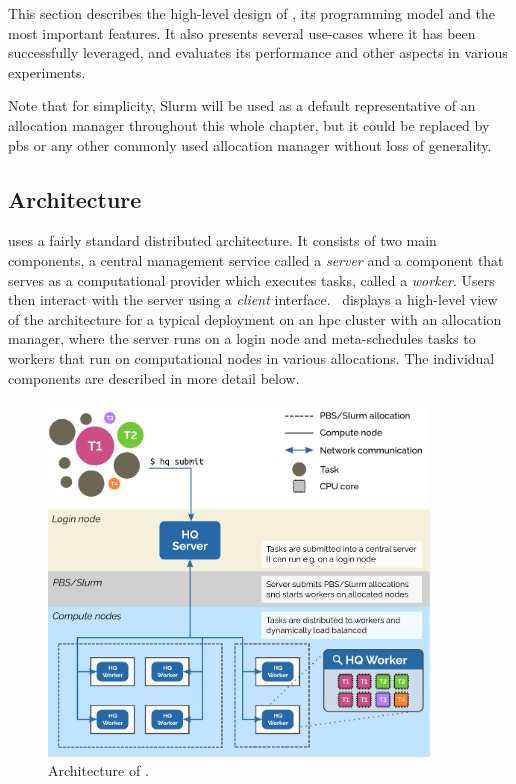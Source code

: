 This section describes the high-level design of \hyperqueue{}, its programming model and
the most important features. It also presents several use-cases where it has been successfully
leveraged, and evaluates its performance and other aspects in various experiments.

Note that for simplicity, Slurm will be used as a default representative of an allocation manager
throughout this whole chapter, but it could be replaced by \gls{pbs} or any other
commonly used allocation manager without loss of generality.

\subsection{Architecture}
\label{hq:architecture}
\hyperqueue{} uses a fairly standard distributed architecture. It consists of two main
components, a central management service called a \emph{server} and a component that
serves as a computational provider which executes tasks, called a \emph{worker}. Users
then interact with the server using a \emph{client} interface.~
displays a high-level view of the \hq{} architecture for a typical deployment on
an \gls{hpc} cluster with an allocation manager, where the server runs on a login
node and meta-schedules tasks to workers that run on computational nodes in various allocations.
The individual components are described in more detail below.

\begin{figure}[h]
	\centering
	\includegraphics[width=0.9\textwidth]{imgs/hq/architecture}
	\caption{Architecture of \hyperqueue{}.}
	\label{fig:hq-architecture}
\end{figure}

